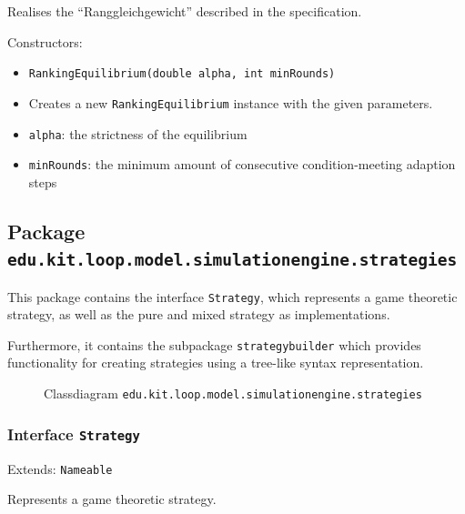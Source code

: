 \documentclass[parskip=full,11pt]{scrartcl}
\begin{document}
Realises the \enquote{Ranggleichgewicht} described in the specification.

Constructors:
\begin{itemize}\itemsep -10pt
\item \texttt{RankingEquilibrium(double alpha, int minRounds)}
\item[] Creates a new \texttt{RankingEquilibrium} instance with the given parameters.
\item[] \texttt{alpha}: the strictness of the equilibrium
\item[] \texttt{minRounds}: the minimum amount of consecutive condition-meeting adaption steps
\end{itemize}

\subsection{Package \texttt{edu.kit.loop.model.simulationengine.strategies}}
This package contains the interface \texttt{Strategy}, which represents a game theoretic strategy, as well as the pure and mixed strategy as implementations.

Furthermore, it contains the subpackage \texttt{strategybuilder} which provides functionality for creating strategies using a tree-like syntax representation.

\iftrue
\begin{figure}[h]
	\centering
	\fontsize{6.25}{8}\selectfont
	

	\caption{Classdiagram \texttt{edu.kit.loop.model.simulationengine.strategies}}
\end{figure}
\fi
\subsubsection{Interface \texttt{Strategy}}
Extends: \texttt{Nameable}

Represents a game theoretic strategy.
\end{document}
